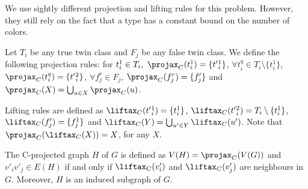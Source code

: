 We use sightly different projection and lifting rules for this problem.
However, they still rely on the fact that a type has a constant bound on the number of colors.

\begin{definition}
    Let $T_i$ be any true twin class and $F_j$ be any false twin class.
    We define the following projection rules:
    for $t_i^1 \in T_i,\ \Proj{C}(t_i^1) = \{t'{_i^1}\}$,
    $\forall t_i^q \in T_i \setminus \{t_i^1\}$, $\Proj{C}(t_i^q) = \{t'{_i^2}\}$,
    $\forall f_j^r \in F_j$, $\Proj{C}(f_j^r) = \{f'_j\}$
    and $\Proj{C}(X) = \bigcup_{u \in X} \Proj{C}(u)$.
    
    Lifting rules are defined as $\Lift{C}(t'{_i^1}) = \{t_i^1\}$,
    $\Lift{C}(t'{_i^2}) = T_i \setminus \{t_i^1\}$,
    $\Lift{C}(f'_j) = \{f_j^1\}$ and $\Lift{C}(Y) = \bigcup_{u' \in Y} \Lift{C}(u')$. Note that $\Proj{C}(\Lift{C}(X)) = X$, for any $X$.
\end{definition}

\begin{definition}
    The C-projected graph $H$ of $G$ is defined as $V(H) = \Proj{C}(V(G))$ and $v'_iv'_j \in E(H)$ if and only if $\Lift{C}(v'_i)$ and $\Lift{C}(v'_j)$ are neighbours in $G$. Moreover, $H$ is an induced subgraph of $G$.
\end{definition}

